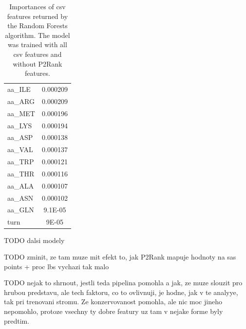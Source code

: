 \begin{table}[]
{\begin{tabular}{@{}lc@{}}
aa\_ILE              & 0.000209            \\
aa\_ARG              & 0.000209            \\
aa\_MET              & 0.000196            \\
aa\_LYS              & 0.000194            \\
aa\_ASP              & 0.000138            \\
aa\_VAL              & 0.000137            \\
aa\_TRP              & 0.000121            \\
aa\_THR              & 0.000116            \\
aa\_ALA              & 0.000107            \\
aa\_ASN              & 0.000102            \\
aa\_GLN              & 9.1E-05             \\
turn                 & 9E-05               \\ \bottomrule
\end{tabular}
}
\caption{Importances of csv features returned by the Random Forests algorithm. The model was trained with all csv features and without P2Rank features.}
\label{tab:importances}
\end{table}






TODO dalsi modely 

TODO zminit, ze tam muze mit efekt to, jak P2Rank mapuje hodnoty na sas points + proc lbs vychazi tak malo

TODO nejak to shrnout, jestli teda pipelina pomohla a jak, ze muze slouzit pro hrubou predstavu, ale tech faktoru, co to ovlivnuji, je hodne, jak v te analyye, tak pri trenovani stromu. Ze konzervovanost pomohla, ale nic moc jineho nepomohlo, protoze vsechny ty dobre featury uz tam v nejake forme byly predtim.



